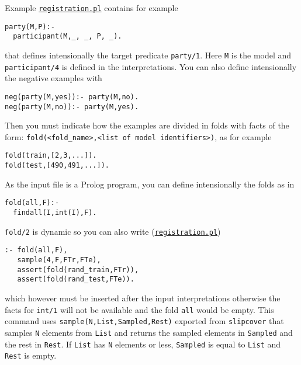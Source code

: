 Example \href{http://cplint.lamping.unife.it/example/registration.pl}{\texttt{registration.pl}} contains for example
\begin{verbatim}
party(M,P):-
  participant(M,_, _, P, _).
\end{verbatim}
that defines intensionally the target predicate \verb|party/1|. Here \verb|M| is the model and \verb|participant/4| is defined in the interpretations.
You can also define intensionally the negative examples with
\begin{verbatim}
neg(party(M,yes)):- party(M,no).
neg(party(M,no)):- party(M,yes).
\end{verbatim}
Then you must indicate how the examples are divided in folds with facts of the form:
\verb|fold(<fold_name>,<list of model identifiers>)|, as for example
\begin{verbatim}
fold(train,[2,3,...]).
fold(test,[490,491,...]).
\end{verbatim}
As the input file is a Prolog program, you can define intensionally the folds as in
\begin{verbatim}
fold(all,F):-
  findall(I,int(I),F).
\end{verbatim}
\verb|fold/2| is dynamic so you can also write (\href{http://cplint.lamping.unife.it/example/registration.pl}{\texttt{registration.pl}})
\begin{verbatim}
:- fold(all,F),
   sample(4,F,FTr,FTe),
   assert(fold(rand_train,FTr)),
   assert(fold(rand_test,FTe)).
\end{verbatim}
which however must be inserted after the input interpretations otherwise the facts for \verb|int/1| will not be available and
the fold \verb|all| would be empty. This command uses  \verb|sample(N,List,Sampled,Rest)| exported from \verb|slipcover| that samples \verb|N| elements from \verb|List| and returns the sampled elements in \verb|Sampled| and the rest in \verb|Rest|. If \verb|List| has \verb|N| elements or less, \verb|Sampled| is equal to \verb|List| 
and \verb|Rest| is empty.
